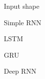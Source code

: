 
\begin{frame}{Input shape}
\end{frame}

\begin{frame}{Simple RNN}
\end{frame}

\begin{frame}{LSTM}
\end{frame}

\begin{frame}{GRU}
\end{frame}

\begin{frame}{Deep RNN}
\end{frame}
